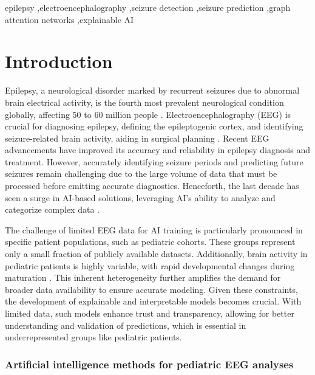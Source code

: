 \documentclass[a4paper,fleqn]{cas-sc}
\begin{document}
\begin{keywords}
epilepsy \sep electroencephalography \sep seizure detection \sep seizure prediction \sep graph attention networks  \sep explainable AI
\end{keywords}

\maketitle

\section{Introduction}
\label{sec:introduction}

Epilepsy, a neurological disorder marked by recurrent seizures due to abnormal brain electrical activity, is the fourth most prevalent neurological condition globally, affecting 50 to 60 million people \cite{PeruccaEpilepsyWorldwide,ThurmanEpilepsyWorldwide}. Electroencephalography (EEG) is crucial for diagnosing epilepsy, defining the epileptogenic cortex, and identifying seizure-related brain activity, aiding in surgical planning \cite{JehiEpilepticZone}. Recent EEG advancements have improved its accuracy and reliability in epilepsy diagnosis and treatment. However, accurately identifying seizure periods and predicting future seizures remain challenging due to the large volume of data that must be processed before emitting accurate diagnostics. Henceforth, the last decade has seen a surge in AI-based solutions, leveraging AI's ability to analyze and categorize complex data \cite{tveit2023automated}. 


The challenge of limited EEG data for AI training is particularly pronounced in specific patient populations, such as pediatric cohorts. These groups represent only a small fraction of publicly available datasets. Additionally, brain activity in pediatric patients is highly variable, with rapid developmental changes during maturation \cite{Kaminska2019PediatricEEG}. This inherent heterogeneity further amplifies the demand for broader data availability to ensure accurate modeling. Given these constraints, the development of explainable and interpretable models becomes crucial. With limited data, such models enhance trust and transparency, allowing for better understanding and validation of predictions, which is essential in underrepresented groups like pediatric patients.

\subsubsection*{Artificial intelligence methods for pediatric EEG analyses}
\end{document}
